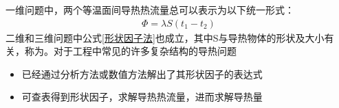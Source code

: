 一维问题中，两个等温面间导热热流量总可以表示为以下统一形式：
\begin{align}
	\varPhi = \lambda S (t_1 - t_2)
	\label{形状因子法}
\end{align}
二维和三维问题中公式\eqref{形状因子法}也成立，其中S与导热物体的形状及大小有关，称为。对于工程中常见的许多复杂结构的导热问题\vspace*{-0.5em}
\begin{itemize}
	\item 已经通过分析方法或数值方法解出了其形状因子的表达式
\vspace*{-0.5em}
	\item 可查表得到形状因子，求解导热热流量，进而求解导热量
\end{itemize}











